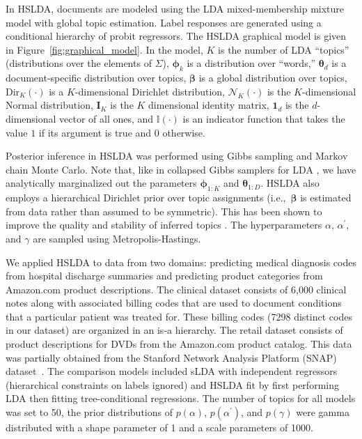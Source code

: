 In HSLDA, documents are modeled using the LDA mixed-membership mixture model
with global topic estimation. Label responses are generated using a conditional
hierarchy of probit regressors\cite{gelmanbda04}. The HSLDA graphical model is given in
Figure~\ref{fig:graphical_model}. In the model, $K$ is the number of LDA
``topics'' (distributions over the elements of $\Sigma$), $\boldsymbol\phi_k$
is a distribution over ``words,'' $\boldsymbol\theta_d$ is a document-specific
distribution over topics, $\boldsymbol\beta$ is a global distribution over
topics, Dir$_{K}(\cdot)$ is a $K$-dimensional Dirichlet distribution,
$\mathcal{N}_{K}(\cdot)$ is the $K$-dimensional Normal distribution,
$\mathbf{I}_{K}$ is the $K$ dimensional identity matrix,  $\mathbf{1}_d$ is the
$d$-dimensional vector of all ones, and $\mathbb{I}(\cdot)$ is an indicator
function that takes the value $1$ if its argument is true and $0$ otherwise. 

Posterior inference in HSLDA was performed using Gibbs sampling and Markov chain Monte Carlo.  Note that, like in collapsed Gibbs samplers for LDA \cite{Griffiths04}, we have analytically marginalized out the parameters $\boldsymbol{\phi}_{1:K}$
and $\boldsymbol{\theta}_{1:D}$. HSLDA also employs a hierarchical Dirichlet prior over topic assignments (i.e.,~$\boldsymbol\beta$ is estimated from data rather than assumed to be symmetric).  This has been shown to improve the quality and stability of inferred topics \citep{WallachMiMc2009}. The hyperparameters $\alpha$, $\alpha^{\prime}$, and $\gamma$ are
sampled
using Metropolis-Hastings. 


We applied HSLDA to data from two domains: predicting medical
diagnosis codes from hospital discharge summaries and predicting product
categories from Amazon.com product descriptions. The clinical dataset consists
of 6,000 clinical notes along with associated billing codes that are used
to document conditions that a particular patient was treated for. These billing
codes (7298 distinct codes in our dataset) are organized in an is-a hierarchy. The retail dataset
consists of product descriptions for DVDs from the Amazon.com product catalog. This data
was partially obtained from the Stanford Network Analysis Platform (SNAP) dataset~\citep{SNAP}. The comparison models included sLDA with independent
regressors (hierarchical constraints on labels ignored) and HSLDA fit by first
performing LDA then fitting tree-conditional regressions. The number of topics for all models was set to 50, the prior distributions of
$p\left(\alpha\right)$, $p\left(\alpha^{\prime}\right)$, and
$p\left(\gamma\right)$ were gamma distributed with a shape parameter of 1 and a
scale parameters of 1000. 

